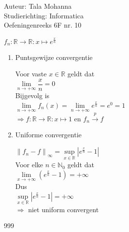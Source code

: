 \documentclass[a4paper]{article}
\begin{document}
  
\noindent \large Auteur: Tala Mohanna \\
\noindent \large Studierichting: Informatica\\
\noindent \large Oefeningenreeks 6F nr. 10\\

\medskip

\normalsize

$ f_n:\mathbb{R}\rightarrow \mathbb{R}: x\mapsto e^{\tfrac{x}{n}} $\\

\begin{enumerate}

\item Puntsgewijze convergentie

Voor vaste $x\in\mathbb{R}$ geldt dat\\

$ \lim\limits_{n\rightarrow +\infty}\dfrac{x}{n}=0 $\\

Bijgevolg is\\

$ \lim\limits_{n\rightarrow +\infty} f_n(x)
= \lim\limits_{n\rightarrow +\infty} e^{\tfrac{x}{n}}
= e^0
=1 $\\

$ \Rightarrow f:\mathbb{R}\rightarrow\mathbb{R}:x\mapsto 1 $ en $ f_n\stackrel{p}{\rightarrow}f $\\

\item Uniforme convergentie

$ \left\|f_n-f\right\|_{\infty}
=\sup\limits_{x\in\mathbb{R}}\left|e^{\tfrac{x}{n}}-1\right| $\\

Voor elke $n\in\mathbb{N}_0$ geldt dat\\

$ \lim\limits_{x\rightarrow +\infty}\left(e^{\tfrac{x}{n}}-1\right)=+\infty $\\

Dus\\

$ \sup\limits_{x\in\mathbb{R}}\left|e^{\tfrac{x}{n}}-1\right|=+\infty $\\

$ \Rightarrow $ niet uniform convergent\\
\end{enumerate}

\begin{thebibliography}{999}
\end{thebibliography}
\end{document}
